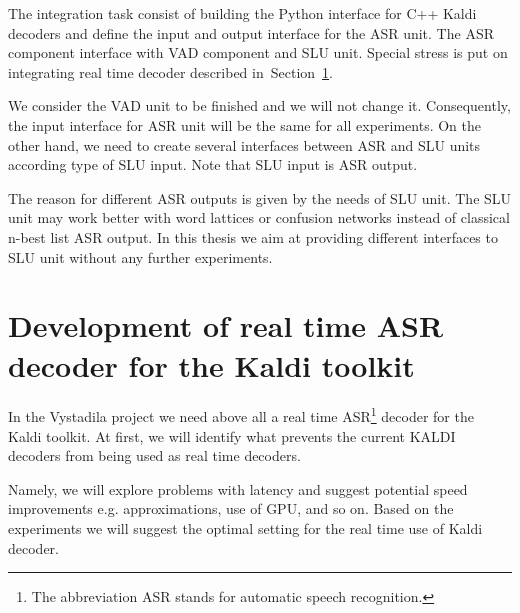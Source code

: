 The integration task consist of building the Python interface for C++ Kaldi decoders and define the input and output interface for the ASR unit. The ASR component interface with VAD component and SLU unit. Special stress is put on integrating real time decoder described in~Section~\ref{sec:kaldi_rt_decoder}.

We consider the VAD unit to be finished and we will not change it. Consequently, the input interface for ASR unit will be the same for all experiments. On the other hand, we need to create several interfaces between ASR and SLU units according type of SLU input. Note that SLU input is ASR output. 

The reason for different ASR outputs is given by the needs of SLU unit. The SLU unit may work better with word lattices or confusion networks instead of classical n-best list ASR output. In this thesis we aim at providing different interfaces to SLU unit without any further experiments.




\section{Development of real time ASR decoder for the Kaldi toolkit}
\label{sec:kaldi_rt_decoder}
In the Vystadila project we need above all a real time ASR\footnote{The abbreviation ASR stands for automatic speech recognition.} decoder for the Kaldi toolkit. At first, we will identify what prevents the current KALDI decoders from being used as real time decoders. 

Namely, we will explore problems with latency and suggest potential speed improvements e.g. approximations, use of GPU, and so on. Based on the experiments we will suggest the optimal setting for the real time use of Kaldi decoder.

